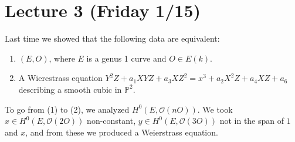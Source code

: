 \section{Lecture 3 (Friday 1/15)}
Last time we showed that the following data are equivalent:
\begin{enumerate}
\item \( (E,O) \), where \( E \) is a genus 1 curve and \( O \in E(k) \).
\item A Wierestrass equation \( Y^2 Z + a_1 XYZ + a_3 XZ^2 =  x^3 + a_2X^2 Z + a_4 X Z + a_6 \) describing a smooth cubic in \( \mathbb{P}^2 \).
\end{enumerate}
To go from (1) to (2), we analyzed \( H^0 \left( E, \mathcal{O}(nO) \right) \).
We took \( x \in H^0 \left( E, \mathcal{O}(2O) \right) \) non-constant, \( y \in H^0 \left( E, \mathcal{O}(3O) \right) \) not in the span of \( 1 \) and \( x \), and from these we produced a Weierstrass equation.

